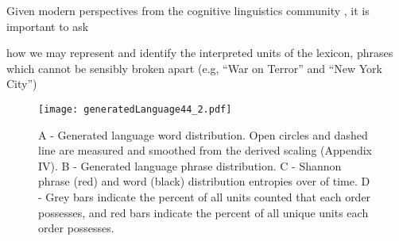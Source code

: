 Given modern perspectives from the cognitive
linguistics community \cite{Lakoff01,Lakoff02}, it is important to ask


how we may represent and identify the interpreted units of the
lexicon, phrases which cannot be sensibly broken apart 
(e.g, ``War on Terror'' and ``New York City'')


\begin{figure*}[tbp!]
  \centering
  \texttt{[image: generatedLanguage44\_2.pdf]}
  \caption{
    A - Generated language word distribution. Open circles and dashed
    line are measured and smoothed from the derived scaling (Appendix IV).
    B - Generated language phrase distribution.  C - Shannon phrase (red)
    and word (black) distribution entropies over of time.  D - Grey bars
    indicate the percent of all units counted that each order possesses,
    and red bars indicate the percent of all unique units each order
    possesses.
  }
  \label{fig:textpart.generatedlanguagezipf}
\end{figure*}


